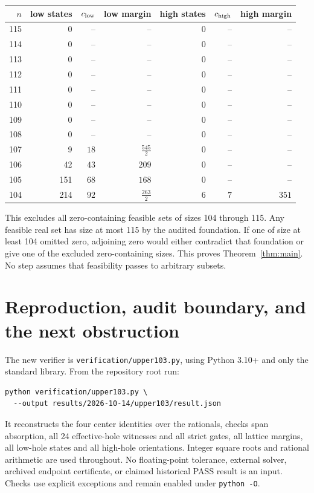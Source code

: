 \documentclass[11pt,a4paper]{article}
\begin{document}
\begin{center}\small
\begin{tabular}{rrrrrrr}
\toprule
$n$ & low states & $c_{\rm low}$ & low margin & high states & $c_{\rm high}$ & high margin\\\midrule
115 & 0 & $\text{--}$ & $\text{--}$ & 0 & $\text{--}$ & $\text{--}$\\
114 & 0 & $\text{--}$ & $\text{--}$ & 0 & $\text{--}$ & $\text{--}$\\
113 & 0 & $\text{--}$ & $\text{--}$ & 0 & $\text{--}$ & $\text{--}$\\
112 & 0 & $\text{--}$ & $\text{--}$ & 0 & $\text{--}$ & $\text{--}$\\
111 & 0 & $\text{--}$ & $\text{--}$ & 0 & $\text{--}$ & $\text{--}$\\
110 & 0 & $\text{--}$ & $\text{--}$ & 0 & $\text{--}$ & $\text{--}$\\
109 & 0 & $\text{--}$ & $\text{--}$ & 0 & $\text{--}$ & $\text{--}$\\
108 & 0 & $\text{--}$ & $\text{--}$ & 0 & $\text{--}$ & $\text{--}$\\
107 & 9 & $18$ & $\frac{545}{2}$ & 0 & $\text{--}$ & $\text{--}$\\
106 & 42 & $43$ & $209$ & 0 & $\text{--}$ & $\text{--}$\\
105 & 151 & $68$ & $168$ & 0 & $\text{--}$ & $\text{--}$\\
104 & 214 & $92$ & $\frac{263}{2}$ & 6 & $7$ & $351$\\
\bottomrule
\end{tabular}
\end{center}


This excludes all zero-containing feasible sets of sizes 104 through
115. Any feasible real set has size at most 115 by the audited foundation.
If one of size at least 104 omitted zero, adjoining zero would either
contradict that foundation or give one of the excluded zero-containing
sizes. This proves Theorem~\ref{thm:main}. No step assumes that feasibility
passes to arbitrary subsets.

\section{Reproduction, audit boundary, and the next obstruction}
The new verifier is \texttt{verification/upper103.py}, using Python 3.10+
and only the standard library. From the repository root run:
\begin{verbatim}
python verification/upper103.py \
  --output results/2026-10-14/upper103/result.json
\end{verbatim}
It reconstructs the four center identities over the rationals, checks
span absorption, all 24 effective-hole witnesses and all strict gates,
all lattice margins, all low-hole states and all high-hole orientations.
Integer square roots and rational arithmetic are used throughout.
No floating-point tolerance, external solver, archived endpoint certificate,
or claimed historical PASS result is an input. Checks use explicit
exceptions and remain enabled under \texttt{python -O}.
\end{document}
